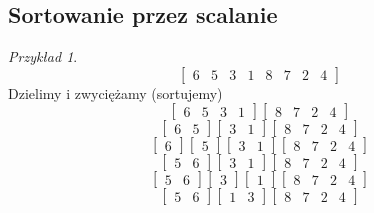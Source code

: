 \documentclass[10pt, oneside]{article}
\theoremstyle{remark}
\newtheorem*{example}{Przykład}
\begin{document}
\subsection{Sortowanie przez scalanie}

\begin{example}

$$\begin{bmatrix}
	6 & 5 & 3 & 1 & 8 & 7 & 2 & 4
\end{bmatrix}$$
Dzielimy i zwyciężamy (sortujemy)
$$\begin{bmatrix}
	6 & 5 & 3 & 1 \end{bmatrix} \begin{bmatrix} 8 & 7 & 2 & 4
\end{bmatrix}$$
$$\begin{bmatrix}
	6 & 5 \end{bmatrix} \begin{bmatrix} 3 & 1 \end{bmatrix} \begin{bmatrix} 8 & 7 & 2 & 4
\end{bmatrix}$$
$$\begin{bmatrix}
	6 \end{bmatrix} \begin{bmatrix} 5 \end{bmatrix} \begin{bmatrix} 3 & 1 \end{bmatrix} \begin{bmatrix} 8 & 7 & 2 & 4
\end{bmatrix}$$
$$\begin{bmatrix}
	5 & 6 \end{bmatrix} \begin{bmatrix} 3 & 1 \end{bmatrix} \begin{bmatrix} 8 & 7 & 2 & 4
\end{bmatrix}$$
$$\begin{bmatrix}
	5 & 6 \end{bmatrix} \begin{bmatrix} 3 \end{bmatrix} \begin{bmatrix} 1 \end{bmatrix} \begin{bmatrix} 8 & 7 & 2 & 4
\end{bmatrix}$$
$$\begin{bmatrix}
	5 & 6 \end{bmatrix} \begin{bmatrix} 1 & 3 \end{bmatrix} \begin{bmatrix} 8 & 7 & 2 & 4

\end{bmatrix}$$
\end{example}
\end{document}
